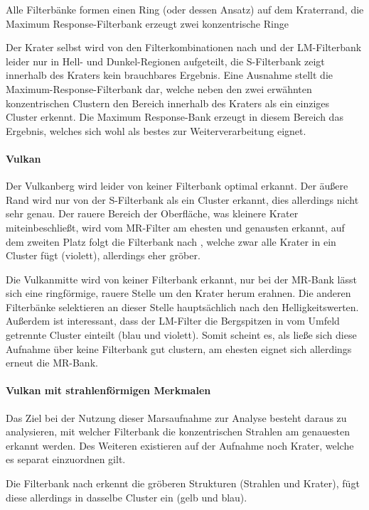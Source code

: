 Alle Filterbänke formen einen Ring (oder dessen Ansatz) auf dem Kraterrand, die Maximum Response-Filterbank erzeugt zwei konzentrische Ringe

Der Krater selbst wird von den Filterkombinationen nach \cite{jain_91} und der LM-Filterbank leider nur in Hell- und Dunkel-Regionen aufgeteilt, die S-Filterbank zeigt innerhalb des Kraters kein brauchbares Ergebnis. Eine Ausnahme stellt die Maximum-Response-Filterbank dar, welche neben den zwei erwähnten konzentrischen Clustern den Bereich innerhalb des Kraters als ein einziges Cluster erkennt. Die Maximum Response-Bank erzeugt in diesem Bereich das Ergebnis, welches sich wohl als bestes zur Weiterverarbeitung eignet.

\paragraph{Vulkan}
Der Vulkanberg wird leider von keiner Filterbank optimal erkannt. Der äußere Rand wird nur von der S-Filterbank als ein Cluster erkannt, dies allerdings nicht sehr genau. Der rauere Bereich der Oberfläche, was kleinere Krater miteinbeschließt, wird vom MR-Filter am ehesten und genausten erkannt, auf dem zweiten Platz folgt die Filterbank nach \cite{jain_91}, welche zwar alle Krater in ein Cluster fügt (violett), allerdings eher gröber.

Die Vulkanmitte wird von keiner Filterbank erkannt, nur bei der MR-Bank lässt sich eine ringförmige, rauere Stelle um den Krater herum erahnen. Die anderen Filterbänke selektieren an dieser Stelle hauptsächlich nach den Helligkeitswerten. Außerdem ist interessant, dass der LM-Filter die Bergspitzen in vom Umfeld getrennte Cluster einteilt (blau und violett). Somit scheint es, als ließe sich diese Aufnahme über keine Filterbank gut clustern, am ehesten eignet sich allerdings erneut die MR-Bank.

\paragraph{Vulkan mit strahlenförmigen Merkmalen}

Das Ziel bei der Nutzung dieser Marsaufnahme zur Analyse besteht daraus zu analysieren, mit welcher Filterbank die konzentrischen Strahlen am genauesten erkannt werden. Des Weiteren existieren auf der Aufnahme noch Krater, welche es separat einzuordnen gilt.

Die Filterbank nach \cite{jain_91} erkennt die gröberen Strukturen (Strahlen und Krater), fügt diese allerdings in dasselbe Cluster ein (gelb und blau).

